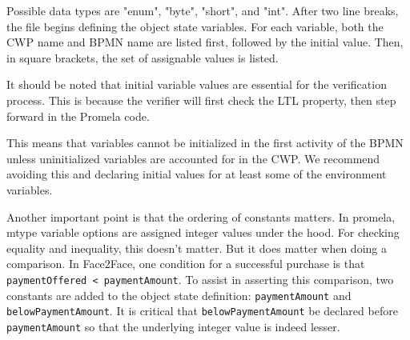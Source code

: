 Possible data types are "enum", "byte", "short", and "int".
After two line breaks, the file begins defining the object state variables. For each variable, both the CWP name and BPMN name are listed first, followed by the initial value. Then, in square brackets, the set of assignable values is listed.

It should be noted that initial variable values are essential for the verification process. This is because the verifier will first check the LTL property, then step forward in the Promela code.


This means that variables cannot be initialized in the first activity of the BPMN unless uninitialized variables are accounted for in the CWP. We recommend avoiding this and declaring initial values for at least some of the environment variables.

Another important point is that the ordering of constants matters. In promela, mtype variable options are assigned integer values under the hood. For checking equality and inequality, this doesn't matter. But it does matter when doing a comparison. In Face2Face, one condition for a successful purchase is that \lstinline[style=myPromela]{paymentOffered < paymentAmount}. 
To assist in asserting this comparison, two constants are added to the object state definition: 
\lstinline[style=myPromela]{paymentAmount}
and \lstinline[style=myPromela]{belowPaymentAmount}. 
It is critical that \lstinline[style=myPromela]{belowPaymentAmount} 
be declared before \lstinline[style=myPromela]{paymentAmount} so that the underlying integer value is indeed lesser.


